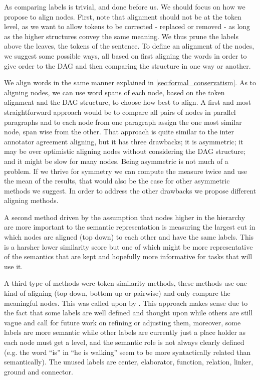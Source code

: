 \documentclass[english]{article}
\begin{document}
As comparing labels is trivial, and done before us. We should focus on how we propose to
align nodes. First, note that alignment should not be at
the token level, as we want to allow tokens to be corrected - replaced or removed -
as long as the higher structures convey the same meaning. We thus
prune the labels above the leaves, the tokens of the sentence. To
define an alignment of the nodes, we suggest some possible ways, all
based on first aligning the words in order to give order to the DAG
and then comparing the structure in one way or another.

We align words in the same manner explained in \ref{sec:formal_conservatism}.
As to aligning nodes, we can use word spans of each node, based on
the token alignment and the DAG structure, to choose how best to align.
A first and most straightforward approach would be to compare all
pairs of nodes in parallel paragraphs and to each node from one paragraph
assign the one most similar node, span wise from the other. That approach
is quite similar to the inter annotator agreement aligning, but it
has three drawbacks; it is asymmetric; it may be over optimistic aligning
nodes without considering the DAG structure; and it might be
slow for many nodes. Being asymmetric is not much of a problem. If we thrive for symmetry
we can compute the measure twice and use the mean of the results,
that would also be the case for other asymmetric methods we suggest.
In order to address the other drawbacks we propose different aligning methods.

A second method driven by the assumption that nodes higher in the
hierarchy are more important to the semantic representation is measuring
the largest cut in which nodes are aligned (top down) to each other
and have the same labels. This is a harsher lower similarity
score but one of which might be more representative of the semantics
that are kept and hopefully more informative for tasks that will use it.

A third type of methods were token similarity methods, these methods
use one kind of aligning (top down, bottom up or pairwise) and only
compare the meaningful nodes. This was called upon by \cite{sulem2015conceptual}. 
This approach makes sense due to the fact that some labels
are well defined and thought upon while others are still vague and
call for future work on refining or adjusting them, moreover, some
labels are more semantic while other labels are currently just a place
holder as each node must get a level, and the semantic role is not
always clearly defined (e.g. the word ``is'' in ``he is walking''
seem to be more syntactically related than semantically). The unused
labels are center, elaborator, function, relation, linker, ground
and connector.
\end{document}
